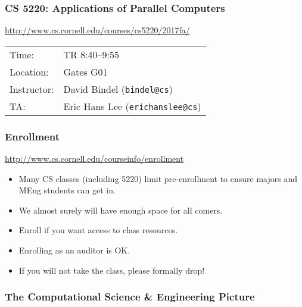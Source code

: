 \documentclass{beamer}
\begin{document}
\begin{frame}
  \titlepage
\end{frame}


\begin{frame}
  \frametitle{CS 5220: Applications of Parallel Computers}

  \begin{center}
    {\small \url{http://www.cs.cornell.edu/courses/cs5220/2017fa/}} \\[1cm]
    \begin{tabular}{ll}
      Time:       & TR 8:40--9:55 \\
      Location:   & Gates G01 \\
      Instructor: & David Bindel ({\tt bindel@cs}) \\
      TA:         & Eric Hans Lee ({\tt erichanslee@cs})
    \end{tabular}
  \end{center}
  
\end{frame}


\begin{frame}
  \frametitle{Enrollment}

  \begin{center}
    {\small \url{http://www.cs.cornell.edu/courseinfo/enrollment}}
  \end{center}

  \begin{itemize}
    \item Many CS classes (including 5220) limit pre-enrollment to
      ensure majors and MEng students can get in.
    \item We almost surely will have enough space for all comers.
    \item Enroll if you want access to class resources.
    \item Enrolling as an auditor is OK.
    \item If you will not take the class, please formally drop!
  \end{itemize}
\end{frame}


\begin{frame}
  \frametitle{The Computational Science \& Engineering Picture}

  \begin{center}
  \end{center}
\end{frame}
\end{document}
